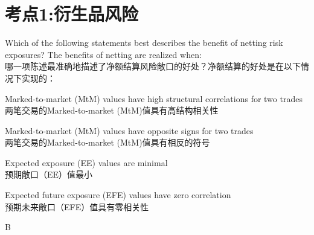 \documentclass{article}
\newcounter{question} %
\begin{document}
 \tableofcontents %
\newpage






\section{考点1:衍生品风险}
\setcounter{question}{0}

\begin{question}
    Which of the following statements best describes the benefit of netting risk exposures? The benefits of netting are realized when:
    \\ 哪一项陈述最准确地描述了净额结算风险敞口的好处？净额结算的好处是在以下情况下实现的：
\end{question}

\begin{choices}
    \item Marked-to-market (MtM) values have high structural correlations for two trades\\
    两笔交易的Marked-to-market (MtM)值具有高结构相关性
    \item Marked-to-market (MtM) values have opposite signs for two trades\\
    两笔交易的Marked-to-market (MtM)值具有相反的符号
    \item Expected exposure (EE) values are minimal\\
    预期敞口（EE）值最小
    \item Expected future exposure (EFE) values have zero correlation\\
    预期未来敞口（EFE）值具有零相关性
\end{choices}

\begin{correctanswer}
    B
\end{correctanswer}
\end{document}
